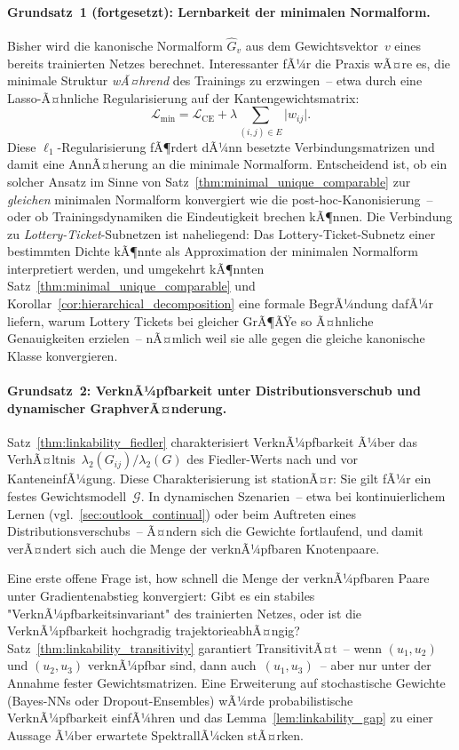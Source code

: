 ﻿\documentclass[12pt, a4paper, openany]{report}
\newcommand{\calG}{\mathcal{G}}
\newcommand{\calL}{\mathcal{L}}
\begin{document}
\paragraph{Grundsatz~1 (fortgesetzt): Lernbarkeit der minimalen Normalform.}
Bisher wird die kanonische Normalform $\hat{G}_v$ aus dem Gewichtsvektor~$v$
eines bereits trainierten Netzes berechnet.  Interessanter fÃ¼r die Praxis
wÃ¤re es, die minimale Struktur \textit{wÃ¤hrend} des Trainings zu erzwingen~--
etwa durch eine Lasso-Ã¤hnliche Regularisierung auf der Kantengewichtsmatrix:
\[
  \calL_{\text{min}} = \calL_{\text{CE}} + \lambda \sum_{(i,j)\in E} \bigl|w_{ij}\bigr|.
\]
Diese $\ell_1$-Regularisierung fÃ¶rdert dÃ¼nn besetzte Verbindungsmatrizen und
damit eine AnnÃ¤herung an die minimale Normalform.  Entscheidend ist, ob ein
solcher Ansatz im Sinne von Satz~\ref{thm:minimal_unique_comparable} zur
\emph{gleichen} minimalen Normalform konvergiert wie die post-hoc-Kanonisierung~--
oder ob Trainingsdynamiken die Eindeutigkeit brechen kÃ¶nnen.  Die Verbindung
zu \emph{Lottery-Ticket}-Subnetzen \cite{frankle19} ist naheliegend: Das
Lottery-Ticket-Subnetz einer bestimmten Dichte kÃ¶nnte als Approximation der
minimalen Normalform interpretiert werden, und umgekehrt kÃ¶nnten
Satz~\ref{thm:minimal_unique_comparable} und
Korollar~\ref{cor:hierarchical_decomposition}
eine formale BegrÃ¼ndung dafÃ¼r liefern, warum Lottery Tickets bei gleicher
GrÃ¶ÃŸe so Ã¤hnliche Genauigkeiten erzielen~-- nÃ¤mlich weil sie alle gegen die
gleiche kanonische Klasse konvergieren.

\paragraph{Grundsatz~2: VerknÃ¼pfbarkeit unter Distributionsverschub und dynamischer GraphverÃ¤nderung.}
Satz~\ref{thm:linkability_fiedler} charakterisiert VerknÃ¼pfbarkeit Ã¼ber das
VerhÃ¤ltnis~$\lambda_2(G_{ij}) / \lambda_2(G)$ des Fiedler-Werts nach und vor
KanteneinfÃ¼gung.  Diese Charakterisierung ist stationÃ¤r: Sie gilt fÃ¼r ein
festes Gewichtsmodell~$\calG$.  In dynamischen Szenarien~-- etwa bei
kontinuierlichem Lernen (vgl.~\cref{sec:outlook_continual}) oder beim
Auftreten eines Distributionsverschubs~-- Ã¤ndern sich die Gewichte fortlaufend,
und damit verÃ¤ndert sich auch die Menge der verknÃ¼pfbaren Knotenpaare.

Eine erste offene Frage ist, how schnell die Menge der verknÃ¼pfbaren Paare
unter Gradientenabstieg konvergiert: Gibt es ein stabiles
"VerknÃ¼pfbarkeitsinvariant" des trainierten Netzes, oder ist die
VerknÃ¼pfbarkeit hochgradig trajektorieabhÃ¤ngig?  Satz~\ref{thm:linkability_transitivity}
garantiert TransitivitÃ¤t~-- wenn $(u_1, u_2)$ und $(u_2, u_3)$ verknÃ¼pfbar
sind, dann auch~$(u_1, u_3)$~-- aber nur unter der Annahme fester
Gewichtsmatrizen.  Eine Erweiterung auf stochastische Gewichte (Bayes-NNs
oder Dropout-Ensembles) wÃ¼rde probabilistische VerknÃ¼pfbarkeit einfÃ¼hren
und das Lemma~\ref{lem:linkability_gap} zu einer Aussage Ã¼ber erwartete
SpektrallÃ¼cken stÃ¤rken.
\end{document}
